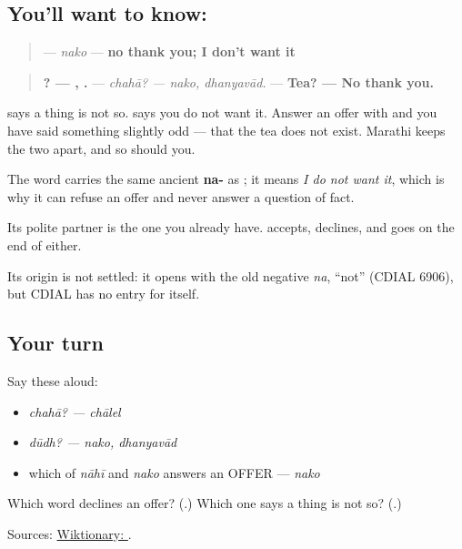 \subsection*{You'll want to know: }
\begin{quote}
\textbf{} — \emph{nako} — \textbf{no thank you; I don't want it}
\end{quote}

\begin{quote}
\textbf{? — , .} — \emph{chahā? — nako, dhanyavād.} — \textbf{Tea? — No thank you.}
\end{quote}

\textbf{} says a thing is not so. \textbf{} says you do not want it. Answer an offer with \textbf{} and you have said something slightly odd — that the tea does not exist. Marathi keeps the two apart, and so should you.

The word carries the same ancient \textbf{na-} as \textbf{}; it means \emph{I do not want it}, which is why it can refuse an offer and never answer a question of fact.

Its polite partner is the one you already have. \textbf{} accepts, \textbf{} declines, and \textbf{} goes on the end of either.

\begin{cousinweb}
Its origin is not settled: it opens with the old negative \emph{na}, \textquotedblleft{}not\textquotedblright{} (CDIAL 6906), but CDIAL has no entry for \textbf{} itself.
\end{cousinweb}

\subsection*{Your turn}
Say these aloud:

\begin{itemize}
\raggedright
  \item \emph{chahā? — chālel}
  \item \emph{dūdh? — nako, dhanyavād}
  \item which of \emph{nāhī} and \emph{nako} answers an OFFER — \emph{nako}
\end{itemize}

\begin{tcolorbox}[breakable,colback=teal!4,colframe=teal!35!black,title={Before you move on}]
Which word declines an offer? (\textbf{}.) Which one says a thing is not so? (\textbf{}.)

Sources: \href{https://en.wiktionary.org/wiki/\%E0\%A4\%A8\%E0\%A4\%95\%E0\%A5\%8B}{Wiktionary: }.
\end{tcolorbox}
